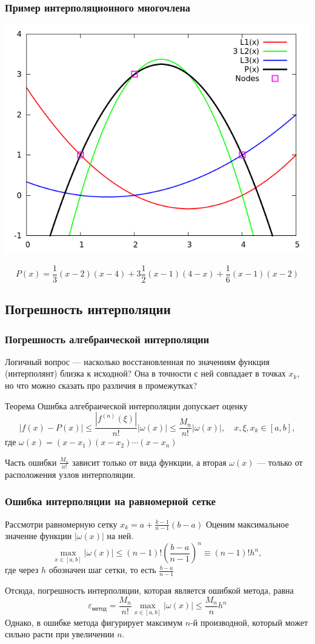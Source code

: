 \documentclass[aspectratio=43,unicode]{beamer}
\begin{document}
\begin{frame}
\frametitle{Пример интерполяционного многочлена}
	\begin{center}
	\includegraphics[height=0.65\textheight]{lp.png}
	\end{center}
	\[
		P(x) = \frac{1}{3}(x-2)(x-4) + 3\frac{1}{2}(x-1)(4-x) + \frac{1}{6}(x-1)(x-2)
	\]
\end{frame}

\subsection{Погрешность интерполяции}
\begin{frame}
\frametitle{Погрешность алгебраической интерполяции}
	Логичный вопрос --- насколько восстановленная по значениям функция (интерполянт)
	близка к исходной? Она в точности с ней совпадает в точках $x_k$, но что можно сказать
	про различия в промежутках?
	\pause

	\begin{block}{Теорема}
	Ошибка алгебраической интерполяции допускает оценку
	$$
	\left| f(x) - P(x) \right| \leqslant \frac{|f^{(n)}(\xi)|}{n!}|\omega(x)| \leqslant \frac{M_n}{n!} |\omega(x)|, \quad x,\xi,x_k \in [a,b],
	$$
	где $\omega(x) = (x-x_1)(x-x_2)\cdots(x-x_n)$
	\end{block}
	\pause
	Часть ошибки $\frac{M_n}{n!}$ зависит только от вида функции, а вторая $\omega(x)$ ---
	только от расположения узлов интерполяции.
\end{frame}

\begin{frame}
\frametitle{Ошибка интерполяции на равномерной сетке}
	Рассмотри равномерную сетку $x_k = a + \frac{k-1}{n-1} (b-a)$
	Оценим максимальное значение функции $|\omega(x)|$ на ней.
	\[
	\max_{x \in [a,b]} |\omega(x)| \leqslant (n-1)!
		\left(\frac{b-a}{n-1}\right)^n \equiv (n-1)! h^n,
	\]
	где через $h$ обозначен шаг сетки, то есть $\frac{b-a}{n-1}$
	\pause

	Отсюда, погрешность интерполяции, которая является ошибкой метода, равна
	\[
	\varepsilon_{\text{метод}} = \frac{M_n}{n!} \max_{x \in [a,b]}| \omega(x) |
		\leqslant \frac{M_n}{n} h^n
	\]
	Однако, в ошибке метода фигурирует максимум $n$-й производной, который
	может сильно расти при увеличении $n$.
\end{frame}
\end{document}

